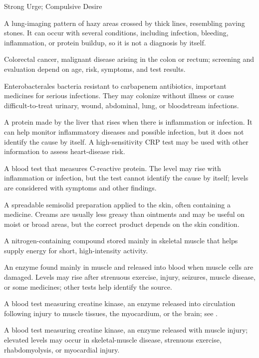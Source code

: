 \synonyms
Strong Urge; Compulsive Desire

 A lung-imaging pattern of hazy areas crossed by thick lines, resembling paving stones. It can occur with several conditions, including infection, bleeding, inflammation, or protein buildup, so it is not a diagnosis by itself.

 Colorectal cancer, malignant disease arising in the colon or rectum; screening and evaluation depend on age, risk, symptoms, and test results.

 Enterobacterales bacteria resistant to carbapenem antibiotics, important medicines for serious infections. They may colonize without illness or cause difficult-to-treat urinary, wound, abdominal, lung, or bloodstream infections.

 A protein made by the liver that rises when there is inflammation or infection. It can help monitor inflammatory diseases and possible infection, but it does not identify the cause by itself. A high-sensitivity CRP test may be used with other information to assess heart-disease risk.

 A blood test that measures C-reactive protein. The level may rise with inflammation or infection, but the test cannot identify the cause by itself; levels are considered with symptoms and other findings.

 A spreadable semisolid preparation applied to the skin, often containing a medicine. Creams are usually less greasy than ointments and may be useful on moist or broad areas, but the correct product depends on the skin condition.

 A nitrogen-containing compound stored mainly in skeletal muscle that helps supply energy for short, high-intensity activity.

 An enzyme found mainly in muscle and released into blood when muscle cells are damaged. Levels may rise after strenuous exercise, injury, seizures, muscle disease, or some medicines; other tests help identify the source.

 A blood test measuring creatine kinase, an enzyme released into circulation following injury to muscle tissues, the myocardium, or the brain; see .

 A blood test measuring creatine kinase, an enzyme released with muscle injury; elevated levels may occur in skeletal-muscle disease, strenuous exercise, rhabdomyolysis, or myocardial injury.


